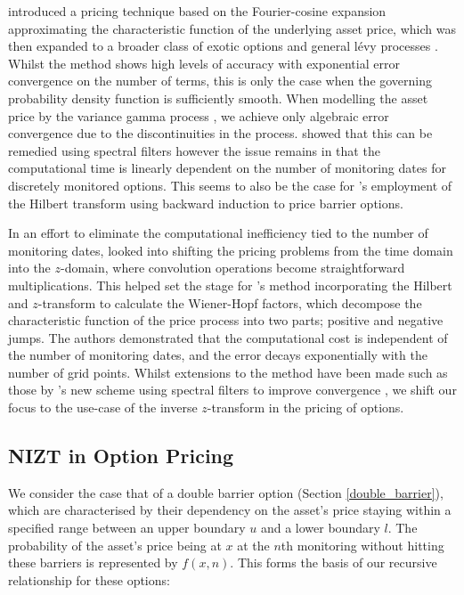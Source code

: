 \documentclass[a4paper]{report}
\begin{document}
\citet{fang2009novel} introduced a pricing technique based on the Fourier-cosine expansion approximating the characteristic function of the underlying asset price, which was then expanded to a broader class of exotic options \citep{fang2009pricing, fang2011fourier} and general l\'evy processes \citep{lord2008fast}. Whilst the method shows high levels of accuracy with exponential error convergence on the number of terms, this is only the case when the governing probability density function is sufficiently smooth. When modelling the asset price by the variance gamma process \citep{madan1998variance}, we achieve only algebraic error convergence due to the discontinuities in the process. \citet{ruijter2015application} showed that this can be remedied using spectral filters however the issue remains in that the computational time is linearly dependent on the number of monitoring dates for discretely monitored options. This seems to also be the case for \citet{feng2008pricing}'s employment of the Hilbert transform using backward induction to price barrier options. 

In an effort to eliminate the computational inefficiency tied to the number of monitoring dates, \citet{fusai2006exact} looked into shifting the pricing problems from the time domain into the $z$-domain, where convolution operations become straightforward multiplications. This helped set the stage for \citet{fusai2016spitzer}'s method incorporating the Hilbert and $z$-transform to calculate the Wiener-Hopf factors, which decompose the characteristic function of the price process into two parts; positive and negative jumps. The authors demonstrated that the computational cost is independent of the number of monitoring dates, and the error decays exponentially with the number of grid points. Whilst extensions to the method have been made such as those by \citet{phelan2018fourier}'s new scheme using spectral filters to improve convergence \citep{phelan2019hilbert}, we shift our focus to the use-case of the inverse $z$-transform in the pricing of options.

\subsection{NIZT in Option Pricing}
We consider the case that of a double barrier option (Section \ref{double_barrier}), which are characterised by their dependency on the asset's price staying within a specified range between an upper boundary $u$ and a lower boundary $l$. The probability of the asset's price being at $x$ at the $n$th monitoring without hitting these barriers is represented by $f(x, n)$. This forms the basis of our recursive relationship for these options:
\end{document}
